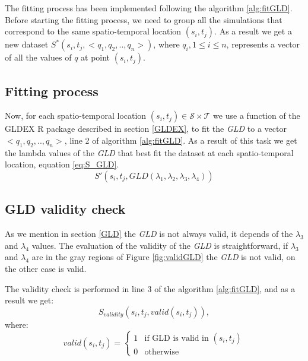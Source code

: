 The fitting process has been implemented following the algorithm \ref{alg:fitGLD}. Before starting the fitting process, we need to group all the simulations that correspond to the same spatio-temporal location $(s_{i},t_{j})$.  As a result we get a new dataset $S^*(s_{i},t_{j},<q_1,q_2,..,q_n>)$, where $q_i, 1 \le i \le n$, represents a vector of all the values of $q$ at point $(s_{i},t_{j})$.

\subsection{Fitting process}
\label{gldFitProcess}
Now, for each spatio-temporal location $(s_{i},t_{j}) \in \mathcal{S} \times \mathcal{T}$ we use a function of the GLDEX R package described in section \ref{GLDEX}, to fit the \textit{GLD} to a vector $<q_1,q_2,..,q_n>$, line 2 of algorithm \ref{alg:fitGLD}. As a result of this task we get the lambda values of the \textit{GLD} that best fit the dataset at each spatio-temporal location, equation \ref{eq:S_GLD}.
\begin{equation}\label{eq:S_GLD}
S'(s_{i},t_{j},GLD(\lambda_{1}, \lambda_{2}, \lambda_{3}, \lambda_{4}))
\end{equation}

\subsection{GLD validity check}
As we mention in section \ref{GLD} the \textit{GLD} is not always valid, it depends of the $\lambda_{3}$  and $\lambda_{4}$ values. The evaluation of the validity of the \textit{GLD} is straightforward, if $\lambda_{3}$  and $\lambda_{4}$ are in the gray regions of Figure \ref{fig:validGLD} the \textit{GLD} is not valid, on the other case is valid.

The validity check is performed in line 3 of the algorithm \ref{alg:fitGLD}, and as a result we get:
\begin{equation}
S_{validity}(s_{i},t_{j},valid(s_{i},t_{j})),
\end{equation}
where:
\begin{equation}
  valid(s_{i},t_{j}) =
  \begin{cases}
    1 & \text{if GLD is valid in $(s_{i},t_{j})$} \\
    0 & \text{otherwise}
  \end{cases}
\end{equation}

